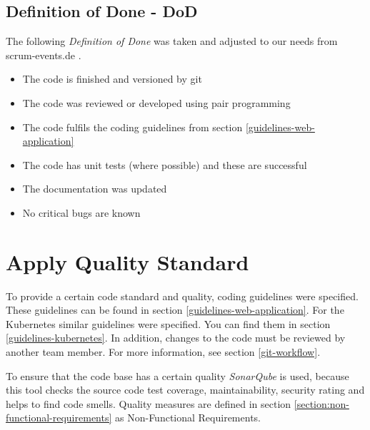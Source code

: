 \subsection{Definition of Done - DoD}
The following \textit{Definition of Done} was taken and adjusted to our needs from scrum-events.de \cite{www.scrum-events.de_dod}.
\begin{itemize}
  \item The code is finished and versioned by git
  \item The code was reviewed or developed using pair programming
  \item The code fulfils the coding guidelines from section \ref{guidelines-web-application}
  \item The code has unit tests (where possible) and these are successful
  \item The documentation was updated
  \item No critical bugs are known
\end{itemize}

\section{Apply Quality Standard}
To provide a certain code standard and quality, coding guidelines were specified.
These guidelines can be found in section \ref{guidelines-web-application}.
For the Kubernetes similar guidelines were specified.
You can find them in section \ref{guidelines-kubernetes}.
In addition, changes to the code must be reviewed by another team member.
For more information, see section \ref{git-workflow}.

\noindent
To ensure that the code base has a certain quality \textit{SonarQube} is used, because this tool checks the source code test coverage, maintainability, security rating and helps to find code smells.
Quality measures are defined in section \ref{section:non-functional-requirements} as Non-Functional Requirements.